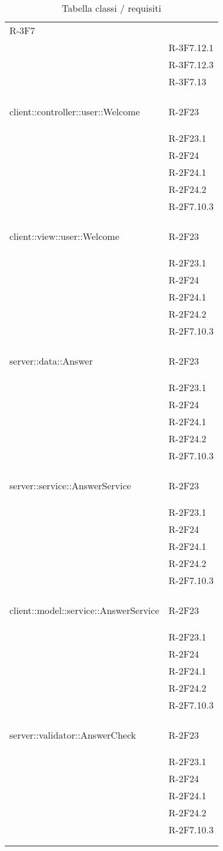 \begin{longtable}{l p{3cm}}
	R-3F7 \tabularnewline &
	
	R-3F7.12.1 \tabularnewline &
	
	R-3F7.12.3 \tabularnewline &
	
	R-3F7.13 \tabularnewline &\tabularnewline
	\hline
	\hypertarget{client::controller::user::Welcome}{client::controller::user::Welcome} & R-2F23 \tabularnewline &
	
	R-2F23.1 \tabularnewline &
	
	R-2F24 \tabularnewline &
	
	R-2F24.1 \tabularnewline &
	
	R-2F24.2 \tabularnewline &
	
	R-2F7.10.3 \tabularnewline &\tabularnewline
	\hline
	\hypertarget{client::view::user::Welcome}{client::view::user::Welcome} & R-2F23 \tabularnewline &
	
	R-2F23.1 \tabularnewline &
	
	R-2F24 \tabularnewline &
	
	R-2F24.1 \tabularnewline &
	
	R-2F24.2 \tabularnewline &
	
	R-2F7.10.3 \tabularnewline &\tabularnewline
	\hline
	\hypertarget{server::data::Answer}{server::data::Answer} & R-2F23 \tabularnewline &
	
	R-2F23.1 \tabularnewline &
	
	R-2F24 \tabularnewline &
	
	R-2F24.1 \tabularnewline &
	
	R-2F24.2 \tabularnewline &
	
	R-2F7.10.3 \tabularnewline &\tabularnewline
	\hline
	\hypertarget{server::service::AnswerService}{server::service::AnswerService} & R-2F23 \tabularnewline &
	
	R-2F23.1 \tabularnewline &
	
	R-2F24 \tabularnewline &
	
	R-2F24.1 \tabularnewline &
	
	R-2F24.2 \tabularnewline &
	
	R-2F7.10.3 \tabularnewline &\tabularnewline
	\hline
	\hypertarget{client::model::service::AnswerService}{client::model::service::AnswerService} & R-2F23 \tabularnewline &
	
	R-2F23.1 \tabularnewline &
	
	R-2F24 \tabularnewline &
	
	R-2F24.1 \tabularnewline &
	
	R-2F24.2 \tabularnewline &
	
	R-2F7.10.3 \tabularnewline &\tabularnewline
	\hline
	\hypertarget{server::validator::AnswerCheck}{server::validator::AnswerCheck} & R-2F23 \tabularnewline &
	
	R-2F23.1 \tabularnewline &
	
	R-2F24 \tabularnewline &
	
	R-2F24.1 \tabularnewline &
	
	R-2F24.2 \tabularnewline &
	
	R-2F7.10.3 \tabularnewline &\tabularnewline
\midrule
\caption{Tabella classi / requisiti} \tabularnewline
\end{longtable}